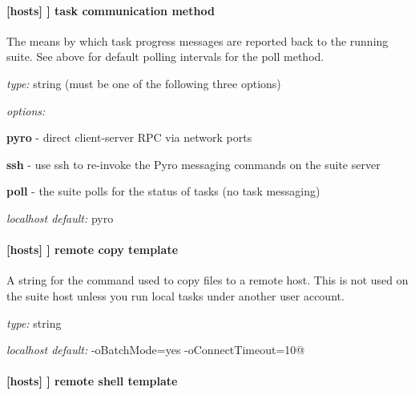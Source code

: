 

\paragraph[task communication method]{[hosts] \textrightarrow [[HOST]] \textrightarrow task communication method }
\label{task_comms_method}

The means by which task progress messages are reported back to the running suite.
See above for default polling intervals for the poll method.

\begin{myitemize}
\item {\em type:} string (must be one of the following three options)
\item {\em options:}
    \begin{myitemize}
    \item {\bf pyro} - direct client-server RPC via network ports
    \item {\bf ssh} - use ssh to re-invoke the Pyro messaging commands on the suite server
    \item {\bf poll} - the suite polls for the status of tasks (no task messaging)
  \end{myitemize}
\item {\em localhost default:} pyro
\end{myitemize}

\paragraph[remote copy template]{[hosts] \textrightarrow [[HOST]] \textrightarrow remote copy template }

A string for the command used to copy files to a remote host. This is not used
on the suite host unless you run local tasks under another user account.

\begin{myitemize}
\item {\em type:} string
\item {\em localhost default:} \lstinline@scp -oBatchMode=yes -oConnectTimeout=10@
\end{myitemize}

\paragraph[remote shell template]{[hosts] \textrightarrow [[HOST]] \textrightarrow remote shell template }

